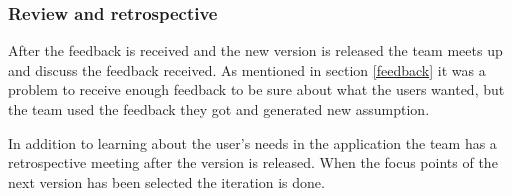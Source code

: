 \subsubsection{Review and retrospective}
After the feedback is received and the new version is released the team meets up and discuss the feedback received. As mentioned in section \ref{feedback} it was a problem to receive enough feedback to be sure about what the users wanted, but the team used the feedback they got and generated new assumption.

In addition to learning about the user’s needs in the application the team has a retrospective meeting after the version is released. When the focus points of the next version has been selected the iteration is done. 







\clearpage








